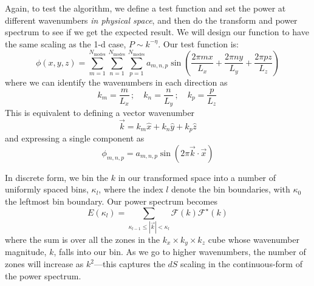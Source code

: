 \documentclass[11pt]{article}
\begin{document}
Again, to test the algorithm, we define a test function and set the power at
different wavenumbers {\em in physical space}, and then do the transform
and power spectrum to see if we get the expected result.  We will design
our function to have the same scaling as the 1-d case, $P \sim k^{-\eta}$.
Our test function
is:
\begin{equation}
\phi(x,y,z) = \sum_{m=1}^{N_\mathrm{modes}} 
              \sum_{n=1}^{N_\mathrm{modes}} 
              \sum_{p=1}^{N_\mathrm{modes}} 
     a_{m,n,p} \sin \left ( \frac{2\pi m x}{L_x} + 
                            \frac{2\pi n y}{L_y} + 
                            \frac{2\pi p z}{L_z} \right )
\end{equation}
where we can identify the wavenumbers in each direction as
\begin{equation}
k_m = \frac{m}{L_x} \, ; \quad 
k_n = \frac{n}{L_y} \, ; \quad 
k_p = \frac{p}{L_z} \,
\end{equation}
This is equivalent to defining a vector wavenumber
\begin{equation}
\vec{k} = k_m \hat{x} + k_n \hat{y} + k_p \hat{z}
\end{equation}
and expressing a single component as
\begin{equation}
\phi_{m,n,p} = a_{m,n,p} \sin(2\pi \vec{k}\cdot \vec{x})
\end{equation}


In discrete form, we bin the $k$ in our transformed space into a
number of uniformly spaced bins, $\kappa_l$, where the index
$l$ denote the bin boundaries, with $\kappa_0$ the leftmost bin boundary.
Our power spectrum becomes
\begin{equation}
E(\kappa_l) = \sum_{\kappa_{l-1} \le |\vec{k}| < \kappa_l} \mathcal{F}(k) \mathcal{F}^\star(k)
\end{equation}
where the sum is over all the zones in the $k_x \times k_y \times k_z$ cube
whose wavenumber magnitude, $k$, falls into our bin.  As we go to
higher wavenumbers, the number of zones will increase as $k^2$---this
captures the $dS$ scaling in the continuous-form of the power spectrum.
\end{document}
